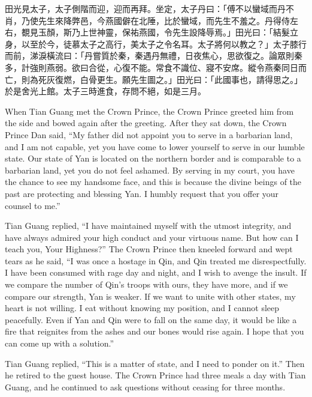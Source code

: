 \documentclass[12pt]{book}
\begin{document}
\begin{pairs}
\begin{Rightside}
\begin{chinese}
\beginnumbering
\pstart
田光見太子，太子側階而迎，迎而再拜。坐定，太子丹曰：「傅不以蠻域而丹不肖，乃使先生來降弊邑，今燕國僻在北陲，比於蠻域，而先生不羞之。丹得侍左右，覩見玉顏，斯乃上世神靈，保祐燕國，令先生設降辱焉。」田光曰：「結髮立身，以至於今，徒慕太子之高行，美太子之令名耳。太子將何以教之？」太子膝行而前，涕淚橫流曰：「丹嘗質於秦，秦遇丹無禮，日夜焦心，思欲復之。論眾則秦多，計強則燕弱。欲曰合從，心復不能。常食不識位、寢不安席。縱令燕秦同日而亡，則為死灰復燃，白骨更生。願先生圖之。」田光曰：「此國事也，請得思之。」於是舍光上館。太子三時進食，存問不絕，如是三月。
\pend
\endnumbering
\end{chinese}
\end{Rightside}
\begin{Leftside}
\begin{fioesjfsoeifj}
\beginnumbering
\pstart
When Tian Guang met the Crown Prince, the Crown Prince greeted him from the side and bowed again after the greeting. After they sat down, the Crown Prince Dan said, ``My father did not appoint you to serve in a barbarian land, and I am not capable, yet you have come to lower yourself to serve in our humble state. Our state of Yan is located on the northern border and is comparable to a barbarian land, yet you do not feel ashamed. By serving in my court, you have the chance to see my handsome face, and this is because the divine beings of the past are protecting and blessing Yan. I humbly request that you offer your counsel to me.''

Tian Guang replied, ``I have maintained myself with the utmost integrity, and have always admired your high conduct and your virtuous name. But how can I teach you, Your Highness?'' The Crown Prince then kneeled forward and wept tears as he said, ``I was once a hostage in Qin, and Qin treated me disrespectfully. I have been consumed with rage day and night, and I wish to avenge the insult. If we compare the number of Qin's troops with ours, they have more, and if we compare our strength, Yan is weaker. If we want to unite with other states, my heart is not willing. I eat without knowing my position, and I cannot sleep peacefully. Even if Yan and Qin were to fall on the same day, it would be like a fire that reignites from the ashes and our bones would rise again. I hope that you can come up with a solution.''

Tian Guang replied, ``This is a matter of state, and I need to ponder on it.'' Then he retired to the guest house. The Crown Prince had three meals a day with Tian Guang, and he continued to ask questions without ceasing for three months.
\pend
\endnumbering
\end{fioesjfsoeifj}
\end{Leftside}
\end{pairs}
\end{document}
